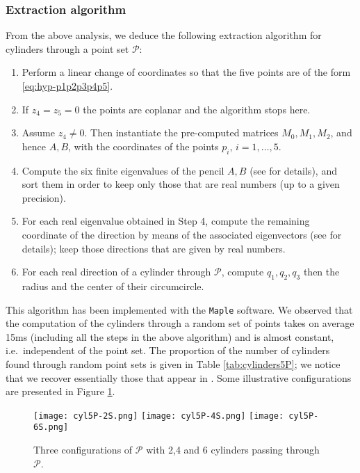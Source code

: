 \documentclass[5p]{elsarticle}
\newcommand\Pc{\mathcal P}
\newcommand{\com}[1]{{\color{black} #1}}
\begin{document}
\subsubsection{Extraction algorithm} 

From the above analysis, we deduce the following extraction algorithm \com{for cylinders} through a point set $\Pc$:
\begin{enumerate}
	\item Perform a linear change of coordinates so that the five points are of the form \eqref{eq:hyp-p1p2p3p4p5}. 
	\item If $z_4=z_5=0$ the points are coplanar and the algorithm stops here.  
	\item Assume $z_4\neq 0$. \com{Then instantiate} the pre-computed matrices $M_0, M_1, M_2$, and hence  $A,B$, with the coordinates of the points $p_i$, $i=1,\ldots,5$. 
	\item Compute the six finite eigenvalues of the pencil $A,B$ (see \cite{BKM05} for details), and sort them in order to keep only those \com{that} are real numbers (up to a given precision).  
	\item For each real eigenvalue obtained \com{in Step 4}, compute the remaining coordinate of the direction by means of the associated eigenvectors (see \cite{BKM05} for details); keep those directions that are given by real numbers.
	\item For each real direction of a cylinder through $\Pc$, compute $q_1,q_2,q_3$ then the radius and the center of their circumcircle.
\end{enumerate} 


This algorithm has been implemented with the {\tt Maple} software. We observed that the computation of the cylinders through a random set of points takes \com{on average} 15ms \com{(including all the steps in the above algorithm)} and is almost constant,   \com{i.e.~independent} of the point set. The proportion of the number of cylinders found through random point sets is given in Table \ref{tab:cylinders5P}; \com{we notice that we recover essentially those that appear in \cite[\S 4.1]{Lichtblau12}}. Some illustrative configurations are presented in Figure \ref{fig:cyl5P}.

\begin{figure}[ht!]
\centering	
   \texttt{[image: cyl5P-2S.png]}
   \hspace{4em}
   \texttt{[image: cyl5P-4S.png]}
   \hspace{4em}
   \texttt{[image: cyl5P-6S.png]}
   \caption{Three configurations of $\Pc$ with 2,4 and 6 cylinders passing through $\Pc$.}\label{fig:cyl5P}
\end{figure}  
    
\end{document}
